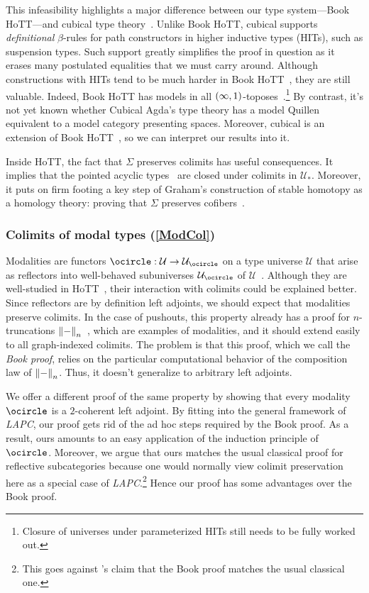 \documentclass[10pt,a4paper]{article}
\theoremstyle{definition}
\theoremstyle{remark}
\newcommand{\U}{\mathcal{U}}
\newcommand{\0}{\mathbf{0}}
\newcommand{\1}{\mathbf{1}}
\newcommand{\2}{\mathbf{2}}
\newcommand{\lN}{\mleft\lVert}
\newcommand{\rN}{\mright\rVert}
\newcommand{\modal}{{\ensuremath{\ocircle}}}
\begin{document}
This infeasibility highlights a major difference between our type system---Book HoTT---and cubical type theory~\cite{cubagda}. Unlike Book HoTT, cubical supports \emph{definitional} $\beta$-rules for path constructors in higher inductive types (HITs), such as suspension types. Such support greatly simplifies the proof in question as it erases many postulated equalities that we must carry around.  Although constructions with HITs tend to be much harder in Book HoTT~\cite{cubsyn}, they are still valuable. Indeed, Book HoTT has models in all $\mleft(\infty,1\mright)$-toposes~\cite{HITsem, topoimod}.\footnote{Closure of universes under parameterized HITs still needs to be fully worked out.} By contrast, it's not yet known whether Cubical Agda's type theory has a model Quillen equivalent to a model category presenting spaces. Moreover, cubical is an extension of Book HoTT~\cite[Section 2.16]{ABCHFL}, so we can interpret our results into it.

Inside HoTT, the fact that $\Sigma$ preserves colimits has useful consequences. It implies that the pointed acyclic types~\cite{acyclic} are closed under colimits in $\U_{\ast}$. Moreover, it puts on firm footing a key step of Graham's construction of stable homotopy as a homology theory: proving that $\Sigma$ preserves cofibers~\cite[Corollary 2.2]{graham}. 

\subsubsection{Colimits of modal types (\autoref{ModCol})} \label{modsum}

Modalities are functors $\modal : \U \to \U_{\modal}$ on a type universe $\U$ that arise as reflectors into well-behaved subuniverses $\U_{\modal}$ of $\U$~\cite{RS}. Although they are well-studied in HoTT~\cite{modaldes, modalchar}, their interaction with colimits could be explained better. Since reflectors are by definition left adjoints, we should expect that modalities preserve colimits.
In the case of pushouts, this property already has a proof for $n$-truncations $\lN{-}\rN_n$~\cite[Section 7.4]{Uni13}, which are examples of modalities, and it should extend easily to all graph-indexed colimits. The problem is that this proof, which we call the \emph{Book proof}, relies on the particular computational behavior of the composition law of $\lN{-}\rN_n$. Thus, it doesn't generalize to arbitrary left adjoints.

We offer a different proof of the same property by showing that every modality $\modal$ is a $2$-coherent left adjoint. By fitting into the general framework of \emph{LAPC}, our proof gets rid of the ad hoc steps required by the Book proof. As a result, ours  amounts to an easy application of the induction principle of $\modal$. Moreover, we argue that ours matches the usual classical proof for reflective subcategories because one would normally view colimit preservation here as a special case of \emph{LAPC}.\footnote{This goes against \cite[Section 7.7]{Uni13}'s claim that the Book proof matches the usual classical one.} Hence our proof has some advantages over the Book proof.
\end{document}
